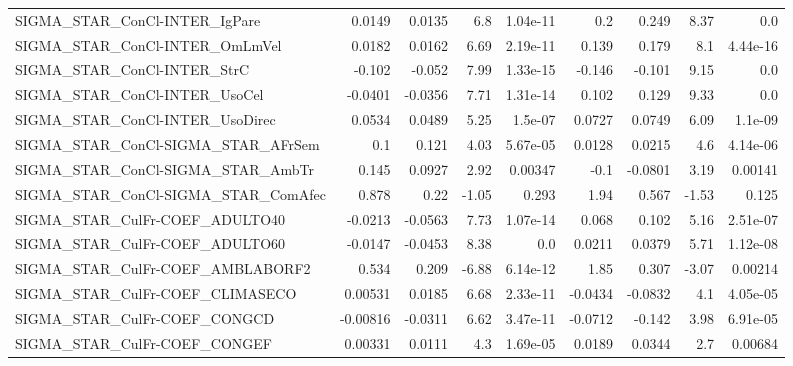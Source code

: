 \begin{tabular}{lrrrrrrrr}
SIGMA\_STAR\_ConCl-INTER\_IgPare          &      0.0149 &       0.0135 &      6.8 & 1.04e-11 &        0.2 &       0.249 &         8.37 &           0.0 \\
SIGMA\_STAR\_ConCl-INTER\_OmLmVel         &      0.0182 &       0.0162 &     6.69 & 2.19e-11 &      0.139 &       0.179 &          8.1 &      4.44e-16 \\
SIGMA\_STAR\_ConCl-INTER\_StrC            &      -0.102 &       -0.052 &     7.99 & 1.33e-15 &     -0.146 &      -0.101 &         9.15 &           0.0 \\
SIGMA\_STAR\_ConCl-INTER\_UsoCel          &     -0.0401 &      -0.0356 &     7.71 & 1.31e-14 &      0.102 &       0.129 &         9.33 &           0.0 \\
SIGMA\_STAR\_ConCl-INTER\_UsoDirec        &      0.0534 &       0.0489 &     5.25 &  1.5e-07 &     0.0727 &      0.0749 &         6.09 &       1.1e-09 \\
SIGMA\_STAR\_ConCl-SIGMA\_STAR\_AFrSem     &         0.1 &        0.121 &     4.03 & 5.67e-05 &     0.0128 &      0.0215 &          4.6 &      4.14e-06 \\
SIGMA\_STAR\_ConCl-SIGMA\_STAR\_AmbTr      &       0.145 &       0.0927 &     2.92 &  0.00347 &       -0.1 &     -0.0801 &         3.19 &       0.00141 \\
SIGMA\_STAR\_ConCl-SIGMA\_STAR\_ComAfec    &       0.878 &         0.22 &    -1.05 &    0.293 &       1.94 &       0.567 &        -1.53 &         0.125 \\
SIGMA\_STAR\_CulFr-COEF\_ADULTO40         &     -0.0213 &      -0.0563 &     7.73 & 1.07e-14 &      0.068 &       0.102 &         5.16 &      2.51e-07 \\
SIGMA\_STAR\_CulFr-COEF\_ADULTO60         &     -0.0147 &      -0.0453 &     8.38 &      0.0 &     0.0211 &      0.0379 &         5.71 &      1.12e-08 \\
SIGMA\_STAR\_CulFr-COEF\_AMBLABORF2       &       0.534 &        0.209 &    -6.88 & 6.14e-12 &       1.85 &       0.307 &        -3.07 &       0.00214 \\
SIGMA\_STAR\_CulFr-COEF\_CLIMASECO        &     0.00531 &       0.0185 &     6.68 & 2.33e-11 &    -0.0434 &     -0.0832 &          4.1 &      4.05e-05 \\
SIGMA\_STAR\_CulFr-COEF\_CONGCD           &    -0.00816 &      -0.0311 &     6.62 & 3.47e-11 &    -0.0712 &      -0.142 &         3.98 &      6.91e-05 \\
SIGMA\_STAR\_CulFr-COEF\_CONGEF           &     0.00331 &       0.0111 &      4.3 & 1.69e-05 &     0.0189 &      0.0344 &          2.7 &       0.00684 \\

\end{tabular}
